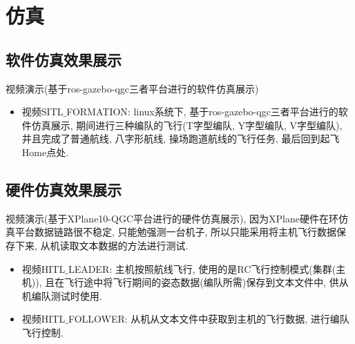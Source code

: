 \chapter{仿真}
    \section{软件仿真效果展示}
        视频演示(基于ros-gazebo-qgc三者平台进行的软件仿真展示)
        \begin{itemize}
            \item 视频SITL$\_$FORMATION: linux系统下, 基于ros-gazebo-qgc三者平台进行的软件仿真展示, 期间进行三种编队的飞行(T字型编队, Y字型编队, V字型编队), 并且完成了普通航线, 八字形航线, 操场跑道航线的飞行任务, 最后回到起飞Home点处. 
        \end{itemize}

    \section{硬件仿真效果展示}
        视频演示(基于XPlane10-QGC平台进行的硬件仿真展示), 因为XPlane硬件在环仿真平台数据链路很不稳定, 只能勉强测一台机子, 所以只能采用将主机飞行数据保存下来, 从机读取文本数据的方法进行测试.
        \begin{itemize}
            \item 视频HITL$\_$LEADER: 主机按照航线飞行, 使用的是RC飞行控制模式(集群(主机)), 且在飞行途中将飞行期间的姿态数据(编队所需)保存到文本文件中, 供从机编队测试时使用. 
            \item 视频HITL$\_$FOLLOWER: 从机从文本文件中获取到主机的飞行数据, 进行编队飞行控制. 
        \end{itemize}
        